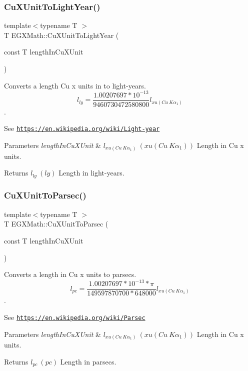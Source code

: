 \subsubsection{\texorpdfstring{Cu\+X\+Unit\+To\+Light\+Year()}{CuXUnitToLightYear()}}
{\footnotesize\ttfamily template$<$typename T $>$ \\
T E\+G\+X\+Math\+::\+Cu\+X\+Unit\+To\+Light\+Year (\begin{DoxyParamCaption}\item[{const T}]{length\+In\+Cu\+X\+Unit }\end{DoxyParamCaption})}



Converts a length Cu x units in to light-\/years. \[ l_{ly}= \frac{1.00207697*10^{-13}}{9460730472580800} l_{xu(Cu\ K\alpha_1)} \]. 

See \href{https://en.wikipedia.org/wiki/Light-year}{\tt https\+://en.\+wikipedia.\+org/wiki/\+Light-\/year} 
\begin{DoxyParams}{Parameters}
{\em length\+In\+Cu\+X\+Unit} & $ l_{xu(Cu\ K\alpha_1)}\ (xu(Cu\ K\alpha_1))$ Length in Cu x units. \\
\hline
\end{DoxyParams}
\begin{DoxyReturn}{Returns}
$ l_{ly}\ (ly)$ Length in light-\/years. 
\end{DoxyReturn}
\mbox{\label{group___e_g_x_math-_conversions-_length_conversions-_non-_s_i-_cu_x_unit-_astronomical_ga53035d7a668e8d79bdfa0dac5322e554}} 
\subsubsection{\texorpdfstring{Cu\+X\+Unit\+To\+Parsec()}{CuXUnitToParsec()}}
{\footnotesize\ttfamily template$<$typename T $>$ \\
T E\+G\+X\+Math\+::\+Cu\+X\+Unit\+To\+Parsec (\begin{DoxyParamCaption}\item[{const T}]{length\+In\+Cu\+X\+Unit }\end{DoxyParamCaption})}



Converts a length in Cu x units to parsecs. \[ l_{pc}=\frac{1.00207697*10^{-13} * \pi}{149597870700 * 648000} l_{xu(Cu\ K\alpha_1)} \]. 

See \href{https://en.wikipedia.org/wiki/Parsec}{\tt https\+://en.\+wikipedia.\+org/wiki/\+Parsec} 
\begin{DoxyParams}{Parameters}
{\em length\+In\+Cu\+X\+Unit} & $ l_{xu(Cu\ K\alpha_1)}\ (xu(Cu\ K\alpha_1))$ Length in Cu x units. \\
\hline
\end{DoxyParams}
\begin{DoxyReturn}{Returns}
$ l_{pc}\ (pc)$ Length in parsecs. 
\end{DoxyReturn}
